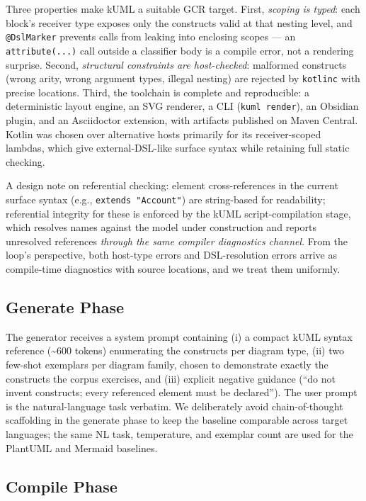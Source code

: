 \documentclass[acmsmall,nonacm]{acmart}
\begin{document}
Three properties make kUML a suitable GCR target. First, \emph{scoping is typed}: each block's receiver type exposes only the constructs valid at that nesting level, and \texttt{@DslMarker} prevents calls from leaking into enclosing scopes --- an \texttt{attribute(...)} call outside a classifier body is a compile error, not a rendering surprise. Second, \emph{structural constraints are host-checked}: malformed constructs (wrong arity, wrong argument types, illegal nesting) are rejected by \texttt{kotlinc} with precise locations. Third, the toolchain is complete and reproducible: a deterministic layout engine, an SVG renderer, a CLI (\texttt{kuml render}), an Obsidian plugin, and an Asciidoctor extension, with artifacts published on Maven Central. Kotlin was chosen over alternative hosts primarily for its receiver-scoped lambdas, which give external-DSL-like surface syntax while retaining full static checking.

A design note on referential checking: element cross-references in the current surface syntax (e.g., \texttt{extends "Account"}) are string-based for readability; referential integrity for these is enforced by the kUML script-compilation stage, which resolves names against the model under construction and reports unresolved references \emph{through the same compiler diagnostics channel}. From the loop's perspective, both host-type errors and DSL-resolution errors arrive as compile-time diagnostics with source locations, and we treat them uniformly.

\subsection{Generate Phase}

The generator receives a system prompt containing (i) a compact kUML syntax reference (\textasciitilde 600 tokens) enumerating the constructs per diagram type, (ii) two few-shot exemplars per diagram family, chosen to demonstrate exactly the constructs the corpus exercises, and (iii) explicit negative guidance (``do not invent constructs; every referenced element must be declared''). The user prompt is the natural-language task verbatim. We deliberately avoid chain-of-thought scaffolding in the generate phase to keep the baseline comparable across target languages; the same NL task, temperature, and exemplar count are used for the PlantUML and Mermaid baselines.

\subsection{Compile Phase}
\end{document}
